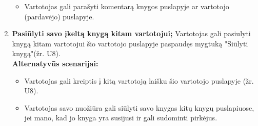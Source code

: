 \documentclass{VUMIFPSkursinis}
\begin{document}
\begin{enumerate}[label=\textbf{U\arabic*.}]
				\begin{itemize}
					\item Vartotojas gali parašyti komentarą knygos puslapyje ar vartotojo (pardavėjo) puslapyje.
				\end{itemize}
			\item \textbf{Pasiūlyti savo įkeltą knygą kitam vartotojui;}
				Vartotojas gali pasiulyti knygą kitam vartotojui šio vartotojo puslapyje paspaudęs mygtuką "Siūlyti knygą"(žr. U8).\\
				\textbf{Alternatyvūs scenarijai:}
				\begin{itemize}
					\item Vartotojas gali kreiptis į kitą vartotoją laišku šio vartotojo puslapyje (žr. U8).
					\item Vartotojas savo nuožiūra gali siūlyti savo knygas kitų knygų puslapiuose, jei mano, kad jo knyga yra susijusi ir gali sudominti pirkėjus.
				\end{itemize}
		\end{enumerate}
\end{document}
